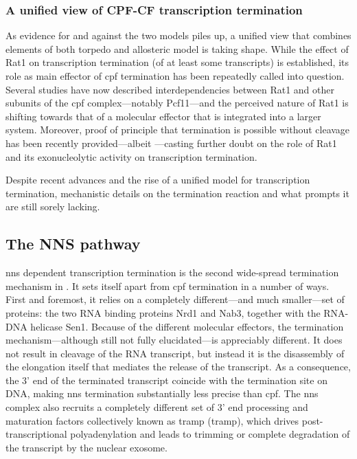 \subsubsection{A unified view of CPF-CF transcription termination}

As evidence for and against the two models piles up, a unified view that combines elements of both torpedo and allosteric model is taking shape.
While the effect of Rat1 on transcription termination (of at least some transcripts) is established, its role as main effector of \gls{cpf} termination has been repeatedly called into question.
Several studies have now described interdependencies between Rat1 and other subunits of the \gls{cpf} complex---notably Pcf11---and the perceived nature of Rat1 is shifting towards that of a molecular effector  that is integrated into a larger system.
Moreover, proof of principle that termination is possible without cleavage has been recently provided---albeit \invitro{}---casting further doubt on the role of Rat1 and its exonucleolytic activity on transcription termination.

Despite recent advances and the rise of a unified model for transcription termination, mechanistic details on the termination reaction and what prompts it are still sorely lacking.



\subsection{The NNS pathway}

\gls{nns} dependent transcription termination is the second wide-spread termination mechanism in \cer{}.
It sets itself apart from \gls{cpf} termination in a number of ways.
First and foremost, it relies on a completely different---and much smaller---set of proteins: the two RNA binding proteins Nrd1 and Nab3, together with the RNA-DNA helicase Sen1.
Because of the different molecular effectors, the termination mechanism---although still not fully elucidated---is appreciably different.
It does not result in cleavage of the RNA transcript, but instead it is the disassembly of the elongation itself that mediates the release of the transcript. 
As a consequence, the 3' end of the terminated transcript coincide with the termination site on DNA, making \gls{nns} termination substantially less precise than \gls{cpf}.
The \gls{nns} complex also recruits a completely different set of 3' end processing and maturation factors collectively known as \gls{tramp} (\glsdesc{tramp}), which drives post-transcriptional polyadenylation and leads to trimming or complete degradation of the transcript by the nuclear exosome. 

